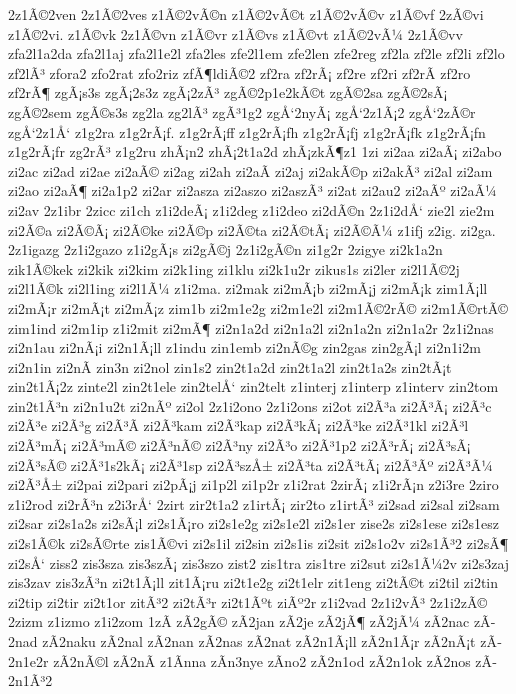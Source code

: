 {2z1Ã©2ven
2z1Ã©2ves
z1Ã©2vÃ©n
z1Ã©2vÃ©t
z1Ã©2vÃ©v
z1Ã©vf
2zÃ©vi
z1Ã©2vi.
z1Ã©vk
2z1Ã©vn
z1Ã©vr
z1Ã©vs
z1Ã©vt
z1Ã©2vÃ¼
2z1Ã©vv
zfa2l1a2da
zfa2l1aj
zfa2l1e2l
zfa2les
zfe2l1em
zfe2len
zfe2reg
zf2la
zf2le
zf2li
zf2lo
zf2lÃ³
zfora2
zfo2rat
zfo2riz
zfÃ¶ldiÃ©2
zf2ra
zf2rÃ¡
zf2re
zf2ri
zf2rÃ­
zf2ro
zf2rÃ¶
zgÃ¡s3s
zgÃ¡2s3z
zgÃ¡2zÃ³
zgÃ©2p1e2kÃ©t
zgÃ©2sa
zgÃ©2sÃ¡
zgÃ©2sem
zgÃ©s3s
zg2la
zg2lÃ³
zgÃ³1g2
zgÅ‘2nyÃ¡
zgÅ‘2z1Ã¡2
zgÅ‘2zÃ©r
zgÅ‘2z1Å‘
z1g2ra
z1g2rÃ¡f.
z1g2rÃ¡ff
z1g2rÃ¡fh
z1g2rÃ¡fj
z1g2rÃ¡fk
z1g2rÃ¡fn
z1g2rÃ¡fr
zg2rÃ³
z1g2ru
zhÃ¡n2
zhÃ¡2t1a2d
zhÃ¡zkÃ¶z1
1zi
zi2aa
zi2aÃ¡
zi2abo
zi2ac
zi2ad
zi2ae
zi2aÃ©
zi2ag
zi2ah
zi2aÃ­
zi2aj
zi2akÃ©p
zi2akÃ³
zi2al
zi2am
zi2ao
zi2aÃ¶
zi2a1p2
zi2ar
zi2asza
zi2aszo
zi2aszÃ³
zi2at
zi2au2
zi2aÃº
zi2aÃ¼
zi2av
2z1ibr
2zicc
zi1ch
z1i2deÃ¡
z1i2deg
z1i2deo
zi2dÃ©n
2z1i2dÅ‘
zie2l
zie2m
zi2Ã©a
zi2Ã©Ã¡
zi2Ã©ke
zi2Ã©p
zi2Ã©ta
zi2Ã©tÃ¡
zi2Ã©Ã¼
z1ifj
z2ig.
zi2ga.
2z1igazg
2z1i2gazo
z1i2gÃ¡s
zi2gÃ©j
2z1i2gÃ©n
zi1g2r
2zigye
zi2k1a2n
zik1Ã©kek
zi2kik
zi2kim
zi2k1ing
zi1klu
zi2k1u2r
zikus1s
zi2ler
zi2l1Ã©2j
zi2l1Ã©k
zi2l1ing
zi2l1Ã¼
z1i2ma.
zi2mak
zi2mÃ¡b
zi2mÃ¡j
zi2mÃ¡k
zim1Ã¡ll
zi2mÃ¡r
zi2mÃ¡t
zi2mÃ¡z
zim1b
zi2m1e2g
zi2m1e2l
zi2m1Ã©2rÃ©
zi2m1Ã©rtÃ©
zim1ind
zi2m1ip
z1i2mit
zi2mÃ¶
zi2n1a2d
zi2n1a2l
zi2n1a2n
zi2n1a2r
2z1i2nas
zi2n1au
zi2nÃ¡i
zi2n1Ã¡ll
z1indu
zin1emb
zi2nÃ©g
zin2gas
zin2gÃ¡l
zi2n1i2m
zi2n1in
zi2nÃ­
zin3n
zi2nol
zin1s2
zin2t1a2d
zin2t1a2l
zin2t1a2s
zin2tÃ¡t
zin2t1Ã¡2z
zinte2l
zin2t1ele
zin2telÅ‘
zin2telt
z1interj
z1interp
z1interv
zin2tom
zin2t1Ã³n
zi2n1u2t
zi2nÃº
zi2ol
2z1i2ono
2z1i2ons
zi2ot
zi2Ã³a
zi2Ã³Ã¡
zi2Ã³c
zi2Ã³e
zi2Ã³g
zi2Ã³Ã­
zi2Ã³kam
zi2Ã³kap
zi2Ã³kÃ¡
zi2Ã³ke
zi2Ã³1kl
zi2Ã³l
zi2Ã³mÃ¡
zi2Ã³mÃ©
zi2Ã³nÃ©
zi2Ã³ny
zi2Ã³o
zi2Ã³1p2
zi2Ã³rÃ¡
zi2Ã³sÃ¡
zi2Ã³sÃ©
zi2Ã³1s2kÃ¡
zi2Ã³1sp
zi2Ã³szÅ±
zi2Ã³ta
zi2Ã³tÃ¡
zi2Ã³Ãº
zi2Ã³Ã¼
zi2Ã³Å±
zi2pai
zi2pari
zi2pÃ¡j
zi1p2l
zi1p2r
z1i2rat
2zirÃ¡
z1i2rÃ¡n
z2i3re
2ziro
z1i2rod
zi2rÃ³n
z2i3rÅ‘
2zirt
zir2t1a2
z1irtÃ¡
zir2to
z1irtÃ³
zi2sad
zi2sal
zi2sam
zi2sar
zi2s1a2s
zi2sÃ¡l
zi2s1Ã¡ro
zi2s1e2g
zi2s1e2l
zi2s1er
zise2s
zi2s1ese
zi2s1esz
zi2s1Ã©k
zi2sÃ©rte
zis1Ã©vi
zi2s1il
zi2sin
zi2s1is
zi2sit
zi2s1o2v
zi2s1Ã³2
zi2sÃ¶
zi2sÅ‘
ziss2
zis3sza
zis3szÃ¡
zis3szo
zist2
zis1tra
zis1tre
zi2sut
zi2s1Ã¼2v
zi2s3zaj
zis3zav
zis3zÃ³n
zi2t1Ã¡ll
zit1Ã¡ru
zi2t1e2g
zi2t1elr
zit1eng
zi2tÃ©t
zi2til
zi2tin
zi2tip
zi2tir
zi2t1or
zitÃ³2
zi2tÃ³r
zi2t1Ãºt
ziÃº2r
z1i2vad
2z1i2vÃ³
2z1i2zÃ©
2zizm
z1izmo
z1i2zom
1zÃ­
zÃ­2gÃ©
zÃ­2jan
zÃ­2je
zÃ­2jÃ¶
zÃ­2jÃ¼
zÃ­2nac
zÃ­2nad
zÃ­2naku
zÃ­2nal
zÃ­2nan
zÃ­2nas
zÃ­2nat
zÃ­2n1Ã¡ll
zÃ­2n1Ã¡r
zÃ­2nÃ¡t
zÃ­2n1e2r
zÃ­2nÃ©l
zÃ­2nÃ­
z1Ã­nna
zÃ­n3nye
zÃ­no2
zÃ­2n1od
zÃ­2n1ok
zÃ­2nos
zÃ­2n1Ã³2
}
